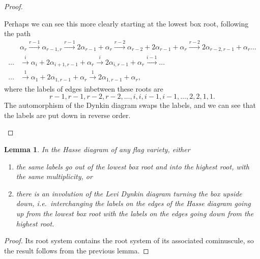 \documentclass[a4paper,10pt]{amsart}
\newtheorem{lemma}{Lemma}
\theoremstyle{remark}
\renewcommand*{\aa}{\alpha}
\begin{document}
\begin{proof}
\begin{itemize}
Perhaps we can see this more clearly starting at the lowest box root, following the path
\begin{align*}
&\aa_r\overset{r-1}{\to}\aa_{r-1,r}\overset{r-1}{\to}2\aa_{r-1}+\aa_r\overset{r-2}{\to}\aa_{r-2}+2\aa_{r-1}+\aa_r\overset{r-2}{\to}2\aa_{r-2,r-1}+\aa_r\dots\\
\dots&{}\overset{i}{\to}\aa_i+2\aa_{i+1,r-1}+\aa_r\overset{i}{\to}2\aa_{i,r-1}+\aa_r\overset{i-1}{\to}\dots\\
\dots&\overset{1}{\to}\aa_1+2\aa_{1,r-1}+\aa_r\overset{1}{\to}2\aa_{1,r-1}+\aa_r,
\end{align*}
where the labels of edges inbetween these roots are
\[
r-1,r-1,r-2,r-2,\dots,i,i,i-1,i-1,\dots,2,2,1,1.
\]
The automorphism of the Dynkin diagram swaps the labels, and we can see that the labels are put down in reverse order.
\end{itemize}
\end{proof}
\begin{lemma}
In the Hasse diagram of any flag variety, either
\begin{enumerate}
\item 
the same labels go out of the lowest box root and into the highest root, with the same multiplicity, or
\item
there is an involution of the Levi Dynkin diagram turning the box upside down, i.e.~interchanging the labels on the edges of the Hasse diagram going up from the lowest box root with the labels on the edges going down from the highest root.
\end{enumerate}
\end{lemma}
\begin{proof}
Its root system contains the root system of its associated cominuscule, so the result follows from the previous lemma.
\end{proof}
\end{document}
